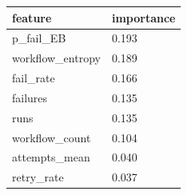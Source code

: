 \begin{table}[t]
\centering
\begin{tabular}{ll}
\hline
feature & importance \\
\hline
p_fail_EB & 0.193 \\
workflow_entropy & 0.189 \\
fail_rate & 0.166 \\
failures & 0.135 \\
runs & 0.135 \\
workflow_count & 0.104 \\
attempts_mean & 0.040 \\
retry_rate & 0.037 \\
\hline
\end{tabular}
\end{table}
